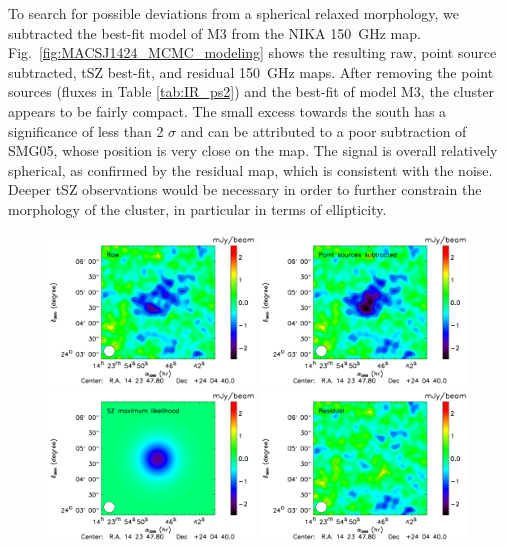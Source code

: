 \documentclass[twocolumn,traditabstract]{aa}
\begin{document}
To search for possible deviations from a spherical relaxed morphology, we subtracted the best-fit model of M3 from the NIKA 150~GHz map. Fig.~\ref{fig:MACSJ1424_MCMC_modeling} shows the resulting raw, point source subtracted, tSZ best-fit, and residual 150~GHz maps. After removing the point sources (fluxes in Table \ref{tab:IR_ps2}) and the best-fit of model M3, the cluster appears to be fairly compact. The small excess towards the south has a significance of less than 2 $\sigma$ and can be attributed to a poor subtraction of SMG05, whose position is very close on the map. The signal is overall relatively spherical, as confirmed by the residual map, which is consistent with the noise. Deeper tSZ observations would be necessary in order to further constrain the morphology of the cluster, in particular in terms of ellipticity.
\begin{figure}[h]
\centering
\includegraphics[width=0.49\textwidth]{Figure/MCMC_raw_map.pdf}
\includegraphics[width=0.49\textwidth]{Figure/MCMC_point_source_removed.pdf}
\includegraphics[width=0.49\textwidth]{Figure/MCMC_best_fit.pdf}
\includegraphics[width=0.49\textwidth]{Figure/MCMC_residual.pdf}

\end{figure}
\end{document}
